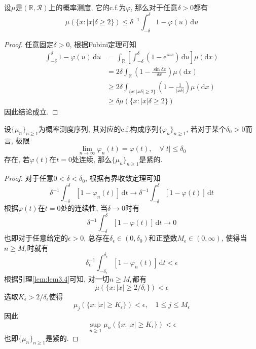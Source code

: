 \documentclass[cn, 12pt, math=mtpro2, bibstyle=apa, blue, twocol]{elegantbook}
\newcommand{\R}{\mathbb{R}}
\newcommand{\limn}{\lim_{n\to\infty}}
\begin{document}
\begin{lemma}\label{lem:lem3.4}
设$\mu$是$(\R,\mathcal{R})$上的概率测度, 它的c.f.为$\varphi$, 那么对于任意$\delta>0$都有
$$\mu(\{x:|x|\delta\ge2\})\leq\delta^{-1}\int_{-\delta}^{\delta}1-\varphi(u)\,\text{d}u$$
\end{lemma}
\begin{proof}
  任意固定$\delta>0$, 根据Fubini定理可知
  \begin{align*}
  \int_{-\delta}^{\delta}1-\varphi(u)\,\text{d}u&=\int_\R\left[\int_{-\delta}^{\delta}(1-\text{e}^{\text{i}ux})\,\text{d}u\right]\mu(\text{d}x) \\
  &=2\delta\int_\R\left(1-\frac{\sin\delta x}{\delta x}\right)\mu(\text{d}x) \\
  &\geq2\delta\int_{\{x:|x\delta|\geq 2\}}\left(1-\frac{1}{|x\delta|}\right)\mu(\text{d}x) \\
  &\geq \delta\mu(\{x:|x|\delta\ge2\})
  \end{align*}
  因此结论成立.
\end{proof}
\begin{lemma}\label{lem:lem3.5}
设$\{\mu_n\}_{n\ge1}$为概率测度序列, 其对应的c.f.构成序列$\{\varphi_n\}_{n\ge1}$, 若对于某个$\delta_0>0$而言, 极限
$$\limn\varphi_n(t)=\varphi(t),\quad \forall |t|\leq \delta_0$$
存在, 若$\varphi(t)$在$t=0$处连续, 那么$\{\mu_n\}_{n\ge1}$是紧的.
\end{lemma}
\begin{proof}
  对于任意$0<\delta<\delta_0$, 根据有界收敛定理可知
  $$\delta^{-1}\int_{-\delta}^{\delta}[1-\varphi_n(t)]\,\text{d}t\to\delta^{-1}\int_{-\delta}^{\delta}[1-\varphi(t)]\,\text{d}t$$
  根据$\varphi(t)$在$t=0$处的连续性, 当$\delta\to0$时有
  $$\delta^{-1}\int_{-\delta}^{\delta}[1-\varphi(t)]\,\text{d}t\to0$$
  也即对于任意给定的$\epsilon>0$, 总存在$\delta_\epsilon\in(0,\delta_0)$和正整数$M_\epsilon\in(0,\infty)$, 使得当$n\geq M_\epsilon$时就有
  $$\delta_{\epsilon}^{-1}\int_{-\delta_\epsilon}^{\delta_\epsilon}[1-\varphi_n(t)]\,\text{d}t<\epsilon$$
  根据引理\ref{lem:lem3.4}可知, 对一切$n\geq M_\epsilon$都有
  $$\mu(\{x:|x|\geq2/\delta_\epsilon\})<\epsilon$$
  选取$K_\epsilon>2/\delta_\epsilon$使得
  $$\mu_j(\{x:|x|\geq K_\epsilon\})<\epsilon,\quad 1\leq j\leq M_\epsilon$$
  因此
  $$\sup_{n\ge1}\mu_n(\{x:|x|\geq K_\epsilon\})<\epsilon$$
  也即$\{\mu_n\}_{n\ge1}$是紧的.
\end{proof}
\end{document}
